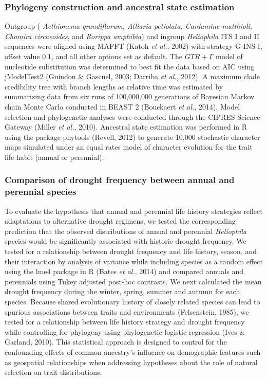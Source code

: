 \documentclass[man,floatsintext]{apa6}
\theoremstyle{definition}
\theoremstyle{definition}
\theoremstyle{definition}
\theoremstyle{remark}
\begin{document}
\hypertarget{phylogeny-construction-and-ancestral-state-estimation}{%
\subsubsection{Phylogeny construction and ancestral state
estimation}\label{phylogeny-construction-and-ancestral-state-estimation}}

Outgroup ( \emph{Aethionema grandiflorum, Alliaria petiolata, Cardamine
matthioli, Chamira circaeoides}, and \emph{Rorippa amphibia}) and
ingroup \emph{Heliophila} ITS I and II sequences were aligned using
MAFFT (Katoh \emph{et al.}, 2002) with strategy G-INS-I, offset value
0.1, and all other options set as default. The \(GTR + \Gamma\) model of
nucleotide substitution was determined to best fit the data based on AIC
using jModelTest2 (Guindon \& Gascuel, 2003; Darriba \emph{et al.},
2012). A maximum clade credibility tree with branch lengths as relative
time was estimated by summarizing data from six runs of 100,000,000
generations of Bayesian Markov chain Monte Carlo conducted in BEAST 2
(Bouckaert \emph{et al.}, 2014). Model selection and phylogenetic
analyses were conducted through the CIPRES Science Gateway (Miller
\emph{et al.}, 2010). Ancestral state estimation was performed in R
using the package phytools (Revell, 2012) to generate 10,000 stochastic
character maps simulated under an equal rates model of character
evolution for the trait life habit (annual or perennial).

\hypertarget{comparison-of-drought-frequency-between-annual-and-perennial-species}{%
\subsubsection{Comparison of drought frequency between annual and
perennial
species}\label{comparison-of-drought-frequency-between-annual-and-perennial-species}}

To evaluate the hypothesis that annual and perennial life history
strategies reflect adaptations to alternative drought regimens, we
tested the corresponding prediction that the observed distributions of
annual and perennial \emph{Heliophila} species would be significantly
associated with historic drought frequency. We tested for a relationship
between drought frequency and life history, season, and their
interaction by analysis of variance while including species as a random
effect using the lme4 package in R (Bates \emph{et al.}, 2014) and
compared annuals and perennials using Tukey adjusted post-hoc contrasts.
We next calculated the mean drought frequency during the winter, spring,
summer and autumn for each species. Because shared evolutionary history
of closely related species can lead to spurious associations between
traits and environments (Felsenstein, 1985), we tested for a
relationship between life history strategy and drought frequency while
controlling for phylogeny using phylogenetic logistic regression (Ives
\& Garland, 2010). This statistical approach is designed to control for
the confounding effects of common ancestry's influence on demographic
features such as geospatial relationships when addressing hypotheses
about the role of natural selection on trait distributions.
\end{document}
